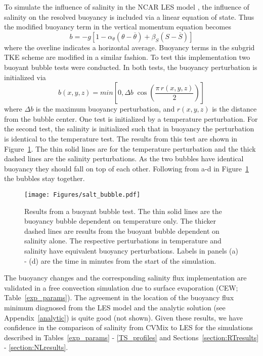 \documentclass[preprint,12pt,authoryear]{agujournal}
\begin{document}
To simulate the influence of salinity in the NCAR LES model \citep{McWilliams1997,sullivan2007surface}, the influence of salinity on the resolved buoyancy is included via a linear equation of state.  Thus the modified buoyancy term in the vertical momentum equation becomes
\begin{equation}
b = -g \left[1 - \alpha_{\theta} \left(\theta - \overline{\theta}\right)    + \beta_{S} \left(S - \overline{S}\right)\right]
\end{equation}
where the overline indicates a horizontal average.  Buoyancy terms in the subgrid TKE scheme are modified in a similar fashion.  To test this implementation two buoyant bubble tests were conducted.  In both tests, the buoyancy perturbation is initialized via
\begin{equation}
b(x,y,z) = min \left[0, \Delta b \; \cos\left(\frac{\pi \, r(x,y,z)}{2}\right) \right]
\end{equation}
where $\Delta b$ is the maximum buoyancy perturbation, and $r(x,y,z)$ is the distance from the bubble center.  One test is initialized by a temperature perturbation.  For the second test, the salinity is initialized such that in buoyancy the perturbation is identical to the temperature test.  The results from this test are shown in Figure~\ref{saltBubble}.  The thin solid lines are for the temperature perturbation and the thick dashed lines are the salinity perturbations.  As the two bubbles have identical buoyancy they should fall on top of each other.  Following from a-d in Figure~\ref{saltBubble} the bubbles stay together.

\begin{figure}[t]
	\centering\texttt{[image: Figures/salt\_bubble.pdf]}
	\caption{Results from a buoyant bubble test.  The thin solid lines are the buoyancy bubble dependent on temperature only.  The thicker dashed lines are results from the buoyant bubble dependent on salinity alone.  The respective perturbations in temperature and salinity have equivalent buoyancy perturbations. Labels in panels (a) - (d) are the time in minutes from the start of the simulation.}
	\label{saltBubble}
\end{figure}

The buoyancy changes and the corresponding salinity flux implementation are validated in a free convection simulation due to surface evaporation (CEW; Table~\ref{exp_params}).  The agreement in the location of the buoyancy flux minimum diagnosed from the LES model and the analytic solution (see Appendix~\ref{analytic}) is quite good (not shown).  Given these results, we have confidence in the comparison of salinity from CVMix to LES for the simulations described in Tables~\ref{exp_params} - \ref{TS_profiles} and Sections~\ref{section:RTresults} - \ref{section:NLresults}.
\end{document}
